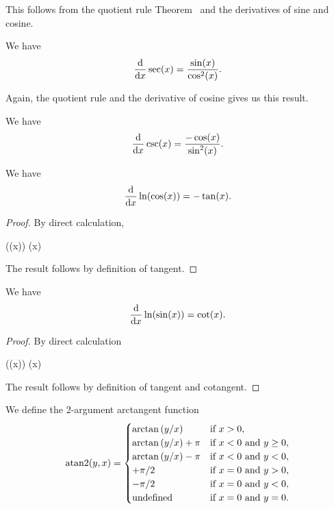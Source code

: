\begin{node}[Trigonometry]
This follows from the quotient rule Theorem~ and the
derivatives of sine and cosine.

\begin{node}\label{calculus-0012}%
  We have
  \[\frac{\mathrm{d}}{\mathrm{d} x}\sec(x)=\frac{\sin(x)}{\cos^{2}(x)}.\]
\end{node}

Again, the quotient rule and the derivative of cosine gives us this result.

\begin{node}\label{calculus-0013}%
  We have
  \[\frac{\mathrm{d}}{\mathrm{d} x}\csc(x)=\frac{-\cos(x)}{\sin^{2}(x)}.\]
\end{node}

\begin{node}\label{calculus-0014}%
  We have
  \[\frac{\mathrm{d}}{\mathrm{d} x}\ln(\cos(x))=-\tan(x).\]
\end{node}

\begin{proof}
By direct calculation,
\begin{calculation}
  \ln(\cos(x))
  \cos(x)
\end{calculation}
The result follows by definition of tangent.
\end{proof}

\begin{node}\label{calculus-0015}%
We have
\[\frac{\mathrm{d}}{\mathrm{d} x}\ln(\sin(x))=\cot(x).\]
\end{node}

\begin{proof}
By direct calculation
\begin{calculation}
  \ln(\sin(x))
  \sin(x)
\end{calculation}
The result follows by definition of tangent and cotangent.
\end{proof}

\begin{definition}\label{calculus-0017}%
We define the 2-argument arctangent function
\begin{equation}
\atan2(y, x) =
\begin{cases}
 \arctan\left(y/x\right) &\mbox{if } x > 0, \\
 \arctan\left(y/x\right) + \pi &\mbox{if } x < 0 \mbox{ and } y \geq 0, \\
 \arctan\left(y/x\right) - \pi &\mbox{if } x < 0 \mbox{ and } y < 0, \\
 +\pi/2 &\mbox{if } x = 0 \mbox{ and } y > 0, \\
 -\pi/2 &\mbox{if } x = 0 \mbox{ and } y < 0, \\
 \mbox{undefined} &\mbox{if } x = 0 \mbox{ and } y = 0.
\end{cases}
\end{equation}
\end{definition}

\end{node} %